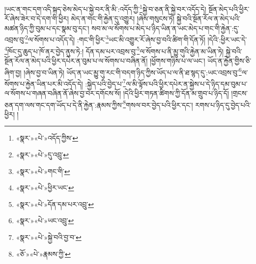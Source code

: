 །ཡང་ན་གང་དག་འདི་སྐད་ཅེས་མེད་པ་སྐྱེ་བར་ནི་མི་:འདོད་ཀྱི་\footnote{«སྣར་»«པེ་»འདོད་ཀྱིས་}སྐྱེ་བ་ཅན་ནི་སྐྱེ་བར་འདོད་དེ། སྔོན་མེད་པའི་ཕྱིར་རོ་ཞེས་ཟེར་བ་དེ་དག་གི་ཕྱིར། མེད་ན་གང་གི་རྐྱེན་དུ་འགྱུར། །ཞེས་གསུངས་ཏེ། སྐྱེ་བའི་སྔོན་རོལ་ན་མེད་པའི་མཚན་ཉིད་ཀྱི་བུམ་པ་དང་སྣམ་བུ་དང་། སབ་མ་ལ་སོགས་པ་མེད་པ་ཉིད་ཡིན་ན་ཡང་མེད་པ་གང་གི་རྐྱེན་:དུ་འབྲས་བུ་\footnote{«སྣར་»«པེ་»དུ་འབྲུ་}ལ་སོགས་པ་འདོད་དེ། :གང་གི་ཕྱིར་\footnote{«སྣར་»«པེ་»གང་གི་}ཡང་མི་འགྱུར་རོ་ཞེས་བྱ་བའི་ཚིག་གི་དོན་ཏོ། །དེའི་:ཕྱིར་ཡང་དེ་\footnote{«སྣར་»«པེ་»ཕྱིར་ཡང་}ཁོང་དུ་ཆུད་པ་ཁོ་ནར་བྱེད་ནུས་ཏེ:། དོན་དམ་པར་འབྲས་བུ་\footnote{«སྣར་»«པེ་»དོན་དམ་པར་འབྲུ་}ལ་སོགས་པ་ནི་མྱུ་གུའི་རྐྱེན་མ་ཡིན་ཏེ། སྐྱེ་བའི་སྔོན་རོལ་ན་མེད་པའི་ཕྱིར་དཔེར་ན་བུམ་པ་ལ་སོགས་པ་བཞིན་ནོ། །ཕྱོགས་གཉིས་པ་ལ་ཡང་། ཡོད་ན་རྐྱེན་གྱིས་ཅི་ཞིག་བྱ། །ཞེས་བྱ་བ་ཡིན་ཏེ། ཡོད་ན་ཡང་མྱུ་གུ་རང་གི་བདག་ཉིད་ཀྱིས་ཡོད་པ་ལ་ནི་ཐ་སྙད་དུ་:ཡང་འབྲས་བུ་\footnote{«སྣར་»«པེ་»ཡང་འབྲུ་}ལ་སོགས་པ་རྐྱེན་ཡིན་པར་མི་འདོད་དེ། :སྐྱེད་པའི་བྱེད་པ་\footnote{«སྣར་»«པེ་»སྐྱེ་བའི་བྱ་བ་}ལ་མི་ལྟོས་པའི་ཕྱིར་དཔེར་ན་སྐྱེས་པ་དེ་ཉིད་དམ་བུམ་པ་ལ་སོགས་པ་གཞན་བཞིན་ནོ་ཞེས་བྱ་བར་དགོངས་སོ། །དེའི་ཕྱིར་གཏན་ཚིགས་ཀྱི་དོན་མ་གྲུབ་པ་ཉིད་དོ། །གྲངས་ཅན་དག་ལས་གང་དག་ཡོད་པ་དེ་ནི་རྐྱེན་:རྣམས་ཀྱིས་\footnote{«ཅོ་»«པེ་»རྣམས་ཀྱི་}གསལ་བར་བྱེད་པའི་ཕྱིར་དང་། རགས་པ་ཉིད་དུ་བྱེད་པའི་ཕྱིར། །
